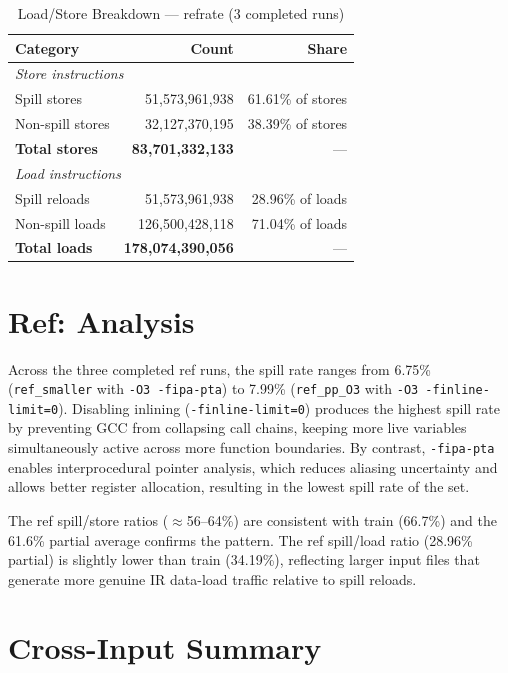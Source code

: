 \documentclass[conference]{IEEEtran}
\begin{document}
\begin{table}[H]
\centering
\caption{Load/Store Breakdown --- refrate (3 completed runs)}
\label{tab:ref_lsbreakdown}
\begin{tabular}{lrr}
\toprule
\textbf{Category} & \textbf{Count} & \textbf{Share} \\
\midrule
\multicolumn{3}{l}{\textit{Store instructions}} \\
\quad Spill stores    & 51,573,961,938 & 61.61\% of stores \\
\quad Non-spill stores & 32,127,370,195 & 38.39\% of stores \\
\quad \textbf{Total stores} & \textbf{83,701,332,133} & --- \\
\midrule
\multicolumn{3}{l}{\textit{Load instructions}} \\
\quad Spill reloads    & 51,573,961,938 & 28.96\% of loads \\
\quad Non-spill loads  & 126,500,428,118 & 71.04\% of loads \\
\quad \textbf{Total loads} & \textbf{178,074,390,056} & --- \\
\bottomrule
\end{tabular}
\end{table}

\section{Ref: Analysis}

Across the three completed ref runs, the spill rate ranges from
6.75\% (\texttt{ref\_smaller} with \texttt{-O3 -fipa-pta}) to
7.99\% (\texttt{ref\_pp\_O3} with \texttt{-O3 -finline-limit=0}).
Disabling inlining (\texttt{-finline-limit=0}) produces the highest
spill rate by preventing GCC from collapsing call chains, keeping more
live variables simultaneously active across more function boundaries.
By contrast, \texttt{-fipa-pta} enables interprocedural pointer
analysis, which reduces aliasing uncertainty and allows better register
allocation, resulting in the lowest spill rate of the set.

The ref spill/store ratios ($\approx$56--64\%) are consistent with
train (66.7\%) and the 61.6\% partial average confirms the pattern.
The ref spill/load ratio (28.96\% partial) is slightly lower than
train (34.19\%), reflecting larger input files that generate more
genuine IR data-load traffic relative to spill reloads.

\section*{Cross-Input Summary}
\end{document}
